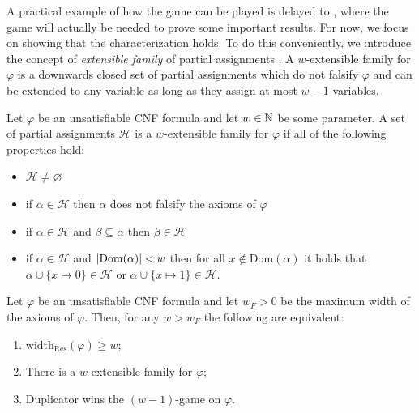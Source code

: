 A practical example of how the game can be played is delayed to , where the game will actually be needed to prove some important results. For now, we focus on showing that the characterization holds. To do this conveniently, we introduce the concept of \textit{extensible family} of partial assignments \cite{atserias_dalmau}. A $w$-extensible family for $\varphi$ is a downwards closed set of partial assignments which do not falsify $\varphi$ and can be extended to any variable as long as they assign at most $w-1$ variables. 

\begin{definition}
    Let $\varphi$ be an unsatisfiable CNF formula and let $w \in \mathbb{N}$ be some parameter. A set of partial assignments $\mathcal{H}$ is a $w$-extensible family for $\varphi$ if all of the following properties hold:
    \begin{itemize}[nosep]
        \item $\mathcal{H} \neq \varnothing$
        \item if $\alpha \in \mathcal{H}$ then $\alpha$ does not falsify the axioms of $\varphi$
        \item if $\alpha \in \mathcal{H}$ and $\beta \subseteq \alpha$ then $\beta \in \mathcal{H}$
        \item if $\alpha \in \mathcal{H}$ and $\left|\mathrm{Dom}(\alpha)\right| < w$ then for all $x \notin \mathrm{Dom}(\alpha)$ it holds that $\alpha \cup \{x \mapsto 0\} \in \mathcal{H}$ or $\alpha \cup \{x \mapsto 1\} \in \mathcal{H}$.
    \end{itemize}
\end{definition}

\begin{theorem}
    Let $\varphi$ be an unsatisfiable CNF formula and let $w_F > 0$ be the maximum width of the axioms of $\varphi$. Then, for any $w > w_F$ the following are equivalent:
    \begin{enumerate}[label={(\roman*)}, nosep]
        \item $\mathrm{width}_{\mathrm{Res}}(\varphi) \geq w$;
        \item There is a $w$-extensible family for $\varphi$;
        \item Duplicator wins the $(w-1)$-game on $\varphi$.
    \end{enumerate}
\end{theorem}


